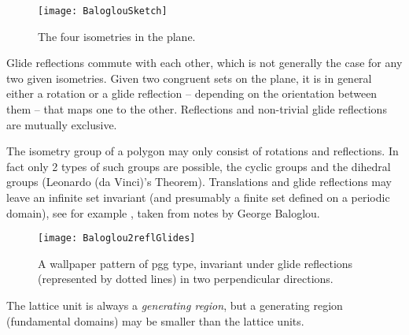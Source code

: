 \begin{description}
{%
\begin{figure}
  \centering
  \texttt{[image: BaloglouSketch]}
  \caption{
The four isometries in the plane.
  }\label{fig:BaloglouSketch}
\end{figure}

Glide reflections commute with each other, which is not generally the
case for any two given isometries. Given two
congruent sets on the plane, it is in general either a rotation or a
glide reflection -- depending on the orientation between them -- that
maps one to the other. Reflections and non-trivial glide reflections are
mutually exclusive.

The isometry group of a polygon may only consist of rotations and
reflections. In fact only 2 types of such groups are possible, the cyclic
groups  and the dihedral groups  (Leonardo (da Vinci)'s Theorem).
Translations and glide reflections may leave an infinite set invariant
(and presumably a finite set defined on a periodic domain),
see for example , taken from notes by
George Baloglou.

\begin{figure}
  \centering
  \texttt{[image: Baloglou2reflGlides]}
  \caption{
A wallpaper pattern of pgg type,
invariant under glide reflections (represented by dotted
lines) in two perpendicular directions.
  }\label{fig:Baloglou2reflGlides}
\end{figure}


The lattice unit is always a \emph{generating region}, but a generating
region (fundamental domains) may be smaller than the lattice units.
    }

\end{description}
